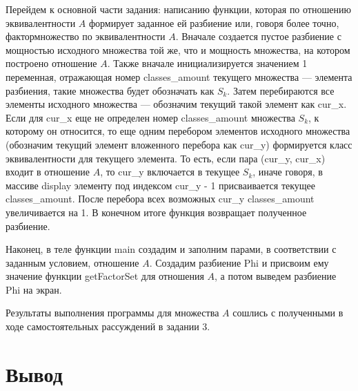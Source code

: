 \documentclass[12pt]{article}
\begin{document}
	 
	
	Перейдем к основной части задания: написанию функции, которая по отношению эквивалентности $A$ формирует заданное ей разбиение или, говоря более точно, фактормножество по эквивалентности $A$. Вначале создается пустое разбиение с мощностью исходного множества той же, что и мощность множества, на котором построено отношение $A$. Также вначале инициализируется значением 1 переменная, отражающая номер classes\_amount текущего множества --- элемента разбиения, такие множества будет обозначать как $S_k$. Затем перебираются все элементы исходного множества --- обозначим текущий такой элемент как cur\_x. Если для cur\_x еще не определен номер classes\_amount множества $S_k$, к которому он относится, то еще одним перебором элементов исходного множества (обозначим текущий элемент вложенного перебора как cur\_y) формируется класс эквивалентности для текущего элемента. То есть, если пара (cur\_y, cur\_x) входит в отношение $A$, то cur\_y включается в текущее $S_k$, иначе говоря, в массиве display элементу под индексом cur\_y - 1 присваивается текущее classes\_amount. После перебора всех возможных cur\_y classes\_amount увеличивается на 1. В конечном итоге функция возвращает полученное разбиение.
		
	 
	
	Наконец, в теле функции main создадим и заполним парами, в соответствии с заданным условием, отношение $A$. Создадим разбиение Phi и присвоим ему значение функции getFactorSet для отношения $A$, а потом выведем разбиение Phi на экран.
	
	 
	
	\begin{figure}[h]
		\noindent{}
	\end{figure}
	
	Результаты выполнения программы для множества $A$ сошлись с полученными в ходе самостоятельных рассуждений в задании 3.
	
	
	\section{Вывод}
	\label{final}
	
\end{document}
